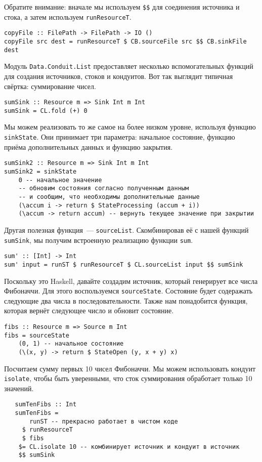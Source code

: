 Обратите внимание: вначале мы используем \verb=$$= для соединения источника и стока, а
затем используем \lstinline=runResourceT=.
\begin{lstlisting}
copyFile :: FilePath -> FilePath -> IO ()
copyFile src dest = runResourceT $ CB.sourceFile src $$ CB.sinkFile dest
\end{lstlisting}
Модуль \lstinline=Data.Conduit.List= предоставляет несколько вспомогательных функций для создания
источников, стоков и кондуитов. Вот так выглядит типичная свёртка: суммирование чисел.
\begin{lstlisting}
sumSink :: Resource m => Sink Int m Int
sumSink = CL.fold (+) 0
\end{lstlisting}
Мы можем реализовать то же самое на более низком уровне, используя функцию \verb=sinkState=.
Они принимает три параметра: начальное состояние, функцию приёма дополнительных данных и функцию закрытия.
\begin{lstlisting}
sumSink2 :: Resource m => Sink Int m Int
sumSink2 = sinkState
    0 -- начальное значение
    -- обновим состояния согласно полученным данным 
    -- и сообщим, что необходимы дополнительные данные
    (\accum i -> return $ StateProcessing (accum + i))
    (\accum -> return accum) -- вернуть текущее значение при закрытии
\end{lstlisting}
Другая полезная функция~--- \verb=sourceList=. Скомбинировав её с нашей функций
\verb=sumSink=, мы получим встроенную реализацию функции \lstinline=sum=.
\begin{lstlisting}
sum' :: [Int] -> Int
sum' input = runST $ runResourceT $ CL.sourceList input $$ sumSink
\end{lstlisting}
Поскольку это Haskell, давайте создадим источник, который генерирует все числа Фибоначчи.
Для этого воспользуемся \lstinline=sourceState=. Состояние будет содеражать
следующие два
числа в последовательности. Также нам понадобится функция, которая вернёт следующее число
и обновит состояние.
\begin{lstlisting}
fibs :: Resource m => Source m Int
fibs = sourceState
    (0, 1) -- начальное состояние
    (\(x, y) -> return $ StateOpen (y, x + y) x)
\end{lstlisting}
Посчитаем сумму первых 10 чисел Фибоначчи. Мы можем использовать кондуит \lstinline=isolate=,
чтобы быть уверенными, что сток суммирования обработает только 10 значений.
\begin{lstlisting}
   sumTenFibs :: Int
   sumTenFibs =
       runST -- прекрасно работает в чистом коде
     $ runResourceT
     $ fibs
    $= CL.isolate 10 -- комбинирует источник и кондуит в источник
    $$ sumSink
\end{lstlisting}
